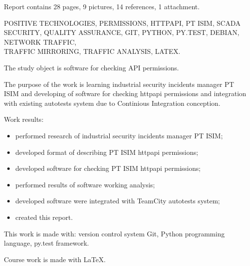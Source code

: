 Report contains 28 pages, 9 pictures, 14 references, 1 attachment.\par

POSITIVE TECHNOLOGIES, PERMISSIONS, HTTPAPI, PT ISIM, SCADA SECURITY, QUALITY ASSURANCE, GIT, PYTHON, PY.TEST, DEBIAN, NETWORK TRAFFIC,\\TRAFFIC MIRRORING, TRAFFIC ANALYSIS, LATEX.\par

The study object is software for checking API permissions.\par

The purpose of the work is learning industrial security incidents manager PT ISIM and developing of software for checking httpapi permissions and integration with existing autotests system due to Continious Integration conception.\par

Work results:

\begin{itemize}
    \item performed research of industrial security incidents manager PT ISIM;
    \item developed format of describing PT ISIM httpapi permissions;
    \item developed software for checking PT ISIM httpapi permissions;
    \item performed results of software working analysis;
    \item developed software were integrated with TeamCity autotests system;
    \item created this report.
\end{itemize}

This work is made with: version control system Git, Python programming language, py.test framework.\par

Course work is made with \LaTeX.\par

\clearpage